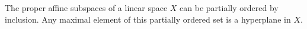 The proper affine subspaces of a linear space $X$ can be partially ordered by inclusion. Any maximal element of this partially ordered set is a hyperplane in $X$.